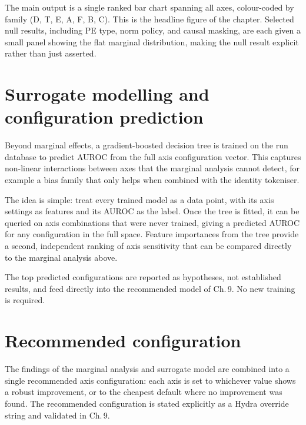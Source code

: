 The main output is a single ranked bar chart spanning all axes,
colour-coded by family (D, T, E, A, F, B, C). This is the headline
figure of the chapter. Selected null results, including PE type, norm
policy, and causal masking, are each given a small panel showing the
flat marginal distribution, making the null result explicit rather than
just asserted.

\section{Surrogate modelling and configuration prediction}

Beyond marginal effects, a gradient-boosted decision tree is trained
on the run database to predict AUROC from the full axis configuration
vector. This captures non-linear interactions between axes that the
marginal analysis cannot detect, for example a bias family that only
helps when combined with the identity tokeniser.

The idea is simple: treat every trained model as a data point, with
its axis settings as features and its AUROC as the label. Once the
tree is fitted, it can be queried on axis combinations that were never
trained, giving a predicted AUROC for any configuration in the full
space. Feature importances from the tree provide a second, independent
ranking of axis sensitivity that can be compared directly to the
marginal analysis above.

The top predicted configurations are reported as hypotheses, not
established results, and feed directly into the recommended model of
Ch.\,9. No new training is required.

\section{Recommended configuration}

The findings of the marginal analysis and surrogate model are combined
into a single recommended axis configuration: each axis is set to
whichever value shows a robust improvement, or to the cheapest default
where no improvement was found. The recommended configuration is stated
explicitly as a Hydra override string and validated in Ch.\,9.
